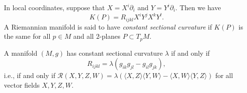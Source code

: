 In local coordinates, suppose that $X = X^{i}\partial_i$ and $Y =
Y^{i}\partial_i$. Then we have
\[ K(P) = R_{ijkl}X^{i}Y^{j}X^{k}Y^{l}.\]
A Riemannian manifold is said to have {\sl constant sectional
curvature} if $K(P)$ is the same for all $p\in M$ and all $2$-planes
$P\subset T_pM$.

\begin{lemma}
\label{lem:constant-curvature-tensor}
\leanok
A manifold $(M,g)$ has constant
sectional curvature $\lambda$ if and only if \[ R_{ijkl} =
\lambda(g_{ik}g_{jl}-g_{il}g_{jk}), \]
i.e., if and only if ${\mathcal R}(X,Y,Z,W)
=\lambda\left(\langle X,Z\rangle\langle Y,W\rangle
-\langle X,W\rangle\langle Y,Z\rangle\right)$ for all vector fields
$X,Y,Z,W$.
\end{lemma}

